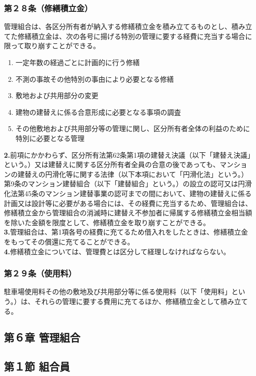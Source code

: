 \documentclass[12pt,uplatex]{jsarticle}
\begin{document}
\subsubsection*{第２８条（修繕積立金）}
管理組合は、各区分所有者が納入する修繕積立金を積み立てるものとし、積み立てた修繕積立金は、次の各号に揚げる特別の管理に要する経費に充当する場合に限って取り崩すことができる。
\begin{enumerate}
\item 一定年数の経過ごとに計画的に行う修繕
\item 不測の事故その他特別の事由により必要となる修繕
\item 敷地および共用部分の変更
\item 建物の建替えに係る合意形成に必要となる事項の調査
\item その他敷地および共用部分等の管理に関し、区分所有者全体の利益のために特別に必要となる管理
\end{enumerate}
\textbf{2.}前項にかかわらず、区分所有法第62条第1項の建替え決議（以下「建替え決議」という。）又は建替えに関する区分所有者全員の合意の後であっても、マンションの建替えの円滑化等に関する法律（以下本項において「円滑化法」という。）第9条のマンション建替組合（以下「建替組合」という。）の設立の認可又は円滑化法第45条のマンション建替事業の認可までの間において、建物の建替えに係る計画又は設計等に必要がある場合には、その経費に充当するため、管理組合は、修繕積立金から管理組合の消滅時に建替え不参加者に帰属する修繕積立金相当額を除いた金額を限度として、修繕積立金を取り崩すことができる。\\
\textbf{3.}管理組合は、第1項各号の経費に充てるため借入れをしたときは、修繕積立金をもってその償還に充てることができる。\\
\textbf{4.}修繕積立金については、管理費とは区分して経理しなければならない。
\subsubsection*{第２９条（使用料）}
駐車場使用料その他の敷地及び共用部分等に係る使用料（以下「使用料」という。）は、それらの管理に要する費用に充てるほか、修繕積立金として積み立てる。

\begin{center}
\subsection*{第６章 管理組合}
\subsection*{第１節 組合員}
\end{center}
\end{document}
